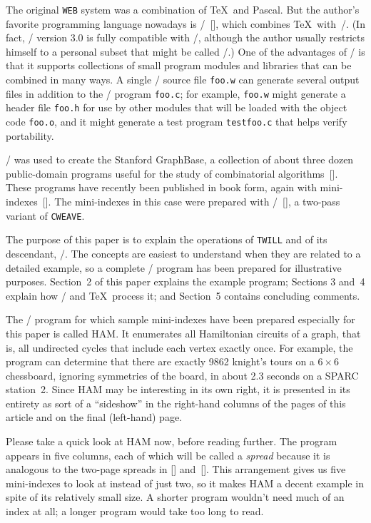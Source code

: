 The original {\tt WEB} system was a combination of \TeX~and Pascal. But
the author's favorite programming language nowadays
is \CWEB/~[\Cweb], which
combines \TeX\ with~\CEE/. (In fact, \CWEB/ version 3.0 is fully compatible
with \CPLUSPLUS/, although the author usually restricts himself to a
personal subset that might be called \CEE/\MM.) One of the advantages of
\CWEB/ is that it supports collections of small program modules and
libraries that can be combined in many ways. A single \CWEB/ source file
{\tt foo.w} can generate several output files in addition to the \CEE/
program {\tt foo.c}; for example, {\tt foo.w} might generate a header file
{\tt foo.h} for use by other modules that will be loaded with the object
code {\tt foo.o}, and it might generate a test program {\tt testfoo.c} that
helps verify portability.

\CWEB/ was used to create the Stanford GraphBase, a collection of about three
dozen public-domain programs useful for the study of combinatorial
algorithms~[\SGBcode]. These programs have recently been published in book
form, again with mini-indexes~[\SGB]. The mini-indexes in this case were
prepared with \CTWILL/~[\Ctwill], a two-pass variant of {\tt CWEAVE}.

The purpose of this paper is to explain the operations of {\tt TWILL} and of
its descendant, \CTWILL/. The concepts are easiest to understand when they
are related to a detailed example, so a complete \CWEB/ program has been
prepared for illustrative purposes. Section~2 of this paper explains the
example program; Sections 3 and~4 explain how \CTWILL/ and \TeX\ process
it; and Section~5 contains concluding comments.

The \CWEB/ program for which sample mini-indexes have been prepared
especially for this paper is called {\sc HAM}. It enumerates all
Hamiltonian circuits of a graph, that is, all undirected cycles that
include each vertex exactly once. For example, the program can determine
that there are exactly 9862 knight's tours on a $6\times6$ chessboard,
ignoring symmetries of the board, in about 2.3 seconds on a SPARC\kern1pt
station~2.
Since {\sc HAM} may be interesting in its own right, it is presented in its
entirety as sort of a ``sideshow'' in the right-hand columns of the pages
of this article and on the final (left-hand) page.

Please take a quick look at {\sc HAM} now, before reading further.
The program appears in five columns, each of which will be called a
{\em spread\/} because it is analogous to the two-page spreads in [\TTP]
and~[\SGB]. This arrangement gives us five mini-indexes to look at
instead of just two, so it makes {\sc HAM} a decent example in spite
of its relatively small size. A shorter program wouldn't need much of an
index at all; a longer program would take too long to read.

